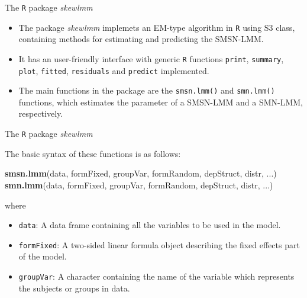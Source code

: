 \documentclass[
  ignorenonframetext,
]{beamer}
\newenvironment{Shaded}{\begin{snugshade}}{\end{snugshade}}
\newcommand{\KeywordTok}[1]{\textcolor[rgb]{0.13,0.29,0.53}{\textbf{#1}}}
\newcommand{\NormalTok}[1]{#1}
\begin{document}
\begin{frame}[fragile]{The \texttt{R} package \emph{skewlmm}}
\protect\hypertarget{the-package}{}

\begin{itemize}
\item
  The package \emph{skewlmm} implemets an EM-type algorithm in
  \texttt{R} using S3 class, containing methods for estimating and
  predicting the SMSN-LMM.
\item
  It has an user-friendly interface with generic \texttt{R} functions
  \texttt{print}, \texttt{summary}, \texttt{plot}, \texttt{fitted},
  \texttt{residuals} and \texttt{predict} implemented.
\item
  The main functions in the package are the \texttt{smsn.lmm()} and
  \texttt{smn.lmm()} functions, which estimates the parameter of a
  SMSN-LMM and a SMN-LMM, respectively.
\end{itemize}

\end{frame}

\begin{frame}[fragile]{The \texttt{R} package \emph{skewlmm}}
\protect\hypertarget{the-package-1}{}

The basic syntax of these functions is as follows:

\begin{Shaded}
\begin{Highlighting}[]
\KeywordTok{smsn.lmm}\NormalTok{(data, formFixed, groupVar, formRandom, }
\NormalTok{         depStruct, distr, ...)}
\KeywordTok{smn.lmm}\NormalTok{(data, formFixed, groupVar, formRandom, }
\NormalTok{        depStruct, distr, ...)}
\end{Highlighting}
\end{Shaded}

where

\begin{itemize}
\item
  \texttt{data}: A data frame containing all the variables to be used in
  the model.
\item
  \texttt{formFixed}: A two-sided linear formula object describing the
  fixed effects part of the model.
\item
  \texttt{groupVar}: A character containing the name of the variable
  which represents the subjects or groups in data.
\end{itemize}

\end{frame}
\end{document}
